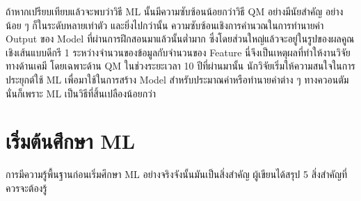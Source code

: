 ถ้าหากเปรียบเทียบแล้วจะพบว่าวิธี ML นั้นมีความซับซ้อนน้อยกว่าวิธี QM อย่างมีนัยสำคัญ อย่างน้อย ๆ ก็ในระดับหลายเท่าตัว และยิ่งไปกว่านั้น
ความซับซ้อนเชิงการคำนวณในการทำนายค่า Output ของ Model ที่ผ่านการฝึกสอนมาแล้วนั้นต่ำมาก ซึ่งโดยส่วนใหญ่แล้วจะอยู่ในรูปของผลคูณเชิงเส้นแบบดีกรี 1 
ระหว่างจำนวนของข้อมูลกับจำนวนของ Feature นี่จึงเป็นเหตุผลที่ทำให้งานวิจัยทางด้านเคมี โดยเฉพาะด้าน QM ในช่วงระยะเวลา 10 ปีที่ผ่านมานั้น 
นักวิจัยเริ่มให้ความสนใจในการประยุกต์ใช้ ML เพื่อมาใช้ในการสร้าง Model สำหรับประมาณค่าหรือทำนายค่าต่าง ๆ ทางควอนตัม นั่นก็เพราะ ML เป็นวิธีที่สิ้นเปลืองน้อยกว่า

\section{เริ่มต้นศึกษา ML}

การมีความรู้พื้นฐานก่อนเริ่มศึกษา ML อย่างจริงจังนั้นมันเป็นสิ่งสำคัญ ผู้เขียนได้สรุป 5 สิ่งสำคัญที่ควรจะต้องรู้ 


